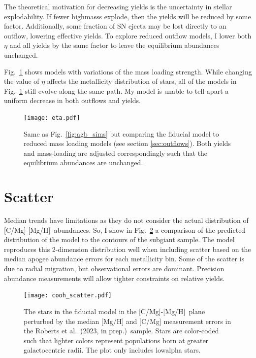 \documentclass[12pt,oneside,letterpaper]{report}
\newcommand{\apogee}{\gls{apogee}}
\newcommand{\caah}{[C/Mg]-[Mg/H]}
\newcommand{\citetjack}{Roberts et al.~(2023, in prep.)}
\begin{document}
The theoretical motivation for decreasing yields is the uncertainty in stellar explodability.
If fewer \gls{highmass}s explode, then the yields will be reduced by some factor. Additionally, some fraction of SN ejecta may be lost directly to an outflow, lowering effective yields. To explore reduced outflow models, I lower both $\eta$ and all yields by the same factor to leave the equilibrium abundances unchanged. 

Fig.~\ref{fig:eta} shows models with variations of the mass loading strength. While changing the value of $\eta$ affects the metallicity distribution of stars, all of the models in Fig.~\ref{fig:eta} still evolve along the same path. My model is unable to tell apart a uniform decrease in both outflows and yields.

\begin{figure}[htp]
    \centering
    \texttt{[image: eta.pdf]}
    \caption[Reduced-outflow models]{Same as Fig.~\ref{fig:agb_sims} but comparing the fiducial model to reduced mass loading models (see section  \ref{sec:outflows}). Both yields and mass-loading are adjusted correspondingly such that the equilibrium abundances are unchanged. }
    \label{fig:eta}
\end{figure}


\section{Scatter}

Median trends have limitations as they do not consider the actual distribution of \caah~abundances. So, I show in Fig.~\ref{fig:scatter} a comparison of the predicted distribution of the model to the contours of the \gls{subgiant} sample. The model reproduces this 2-dimension distribution well when including scatter based on the median \apogee{} abundance errors for each metallicity bin. Some of the scatter is due to radial migration, but observational errors are dominant. Precision abundance measurements will allow tighter constraints on relative yields. 

\begin{figure}[htp]
    \centering
    \texttt{[image: cooh\_scatter.pdf]}
    \caption[Scatter agreement]{The stars in the fiducial model in the \caah~plane perturbed by the median [Mg/H] and [C/Mg] measurement errors in the \citetjack~sample. Stars are color-coded such that lighter colors represent populations born at greater galactocentric radii. The plot only includes \gls{lowalpha} stars.
    }
    \label{fig:scatter}
\end{figure}
\end{document}
